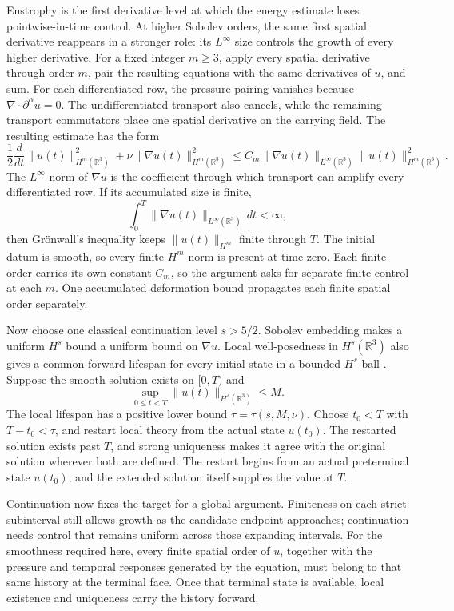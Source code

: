 
Enstrophy is the first derivative level at which the energy estimate loses pointwise-in-time control.
At higher Sobolev orders, the same first spatial derivative reappears in a stronger role: its \(L^\infty\) size controls the growth of every higher derivative.
For a fixed integer \(m\geq3\), apply every spatial derivative through order \(m\), pair the resulting equations with the same derivatives of \(u\), and sum.
For each differentiated row, the pressure pairing vanishes because \(\nabla\cdot\partial^\alpha u=0\).
The undifferentiated transport also cancels, while the remaining transport commutators place one spatial derivative on the carrying field.
The resulting estimate has the form
\[
  \frac12\frac{d}{dt}\lVert u(t)\rVert_{H^m(\mathbb R^3)}^2
  +\nu\lVert\nabla u(t)\rVert_{H^m(\mathbb R^3)}^2
  \leq
  C_m\lVert\nabla u(t)\rVert_{L^\infty(\mathbb R^3)}
  \lVert u(t)\rVert_{H^m(\mathbb R^3)}^2.
\]
The \(L^\infty\) norm of \(\nabla u\) is the coefficient through which transport can amplify every differentiated row.
If its accumulated size is finite,
\[
  \int_0^T
  \lVert\nabla u(t)\rVert_{L^\infty(\mathbb R^3)}\,dt
  <\infty,
\]
then Gr\"onwall's inequality keeps \(\lVert u(t)\rVert_{H^m}\) finite through \(T\).
The initial datum is smooth, so every finite \(H^m\) norm is present at time zero.
Each finite order carries its own constant \(C_m\), so the argument asks for separate finite control at each \(m\).
One accumulated deformation bound propagates each finite spatial order separately.

Now choose one classical continuation level \(s>5/2\).
Sobolev embedding makes a uniform \(H^s\) bound a uniform bound on \(\nabla u\).
Local well-posedness in \(H^s(\mathbb R^3)\) also gives a common forward lifespan for every initial state in a bounded \(H^s\) ball \parencite{FujitaKato1964,Kato1984}.
Suppose the smooth solution exists on \([0,T)\) and
\[
  \sup_{0\leq t<T}
  \lVert u(t)\rVert_{H^s(\mathbb R^3)}
  \leq M.
\]
The local lifespan has a positive lower bound \(\tau=\tau(s,M,\nu)\).
Choose \(t_0<T\) with \(T-t_0<\tau\), and restart local theory from the actual state \(u(t_0)\).
The restarted solution exists past \(T\), and strong uniqueness makes it agree with the original solution wherever both are defined.
The restart begins from an actual preterminal state \(u(t_0)\), and the extended solution itself supplies the value at \(T\).

Continuation now fixes the target for a global argument.
Finiteness on each strict subinterval still allows growth as the candidate endpoint approaches; continuation needs control that remains uniform across those expanding intervals.
For the smoothness required here, every finite spatial order of \(u\), together with the pressure and temporal responses generated by the equation, must belong to that same history at the terminal face.
Once that terminal state is available, local existence and uniqueness carry the history forward.

